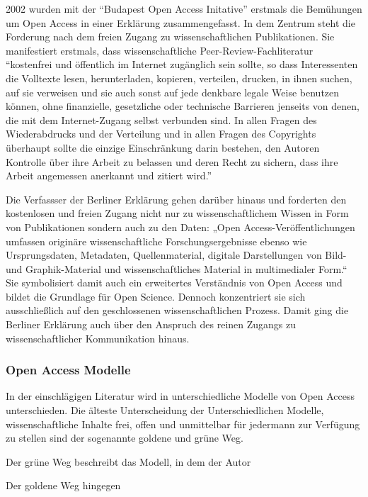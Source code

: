 2002 wurden mit der “Budapest Open Access Initative”\cite{cite:21} erstmals die Bemühungen um Open Access in einer Erklärung zusammengefasst. In dem Zentrum steht die Forderung nach dem freien Zugang zu wissenschaftlichen Publikationen. Sie manifestiert erstmals, dass wissenschaftliche Peer-Review-Fachliteratur “kostenfrei und öffentlich im Internet zugänglich sein sollte, so dass Interessenten die Volltexte lesen, herunterladen, kopieren, verteilen, drucken, in ihnen suchen, auf sie verweisen und sie auch sonst auf jede denkbare legale Weise benutzen können, ohne finanzielle, gesetzliche oder technische Barrieren jenseits von denen, die mit dem Internet-Zugang selbst verbunden sind. In allen Fragen des Wiederabdrucks und der Verteilung und in allen Fragen des Copyrights überhaupt sollte die einzige Einschränkung darin bestehen, den Autoren Kontrolle über ihre Arbeit zu belassen und deren Recht zu sichern, dass ihre Arbeit angemessen anerkannt und zitiert wird.” 

Die Verfassser der Berliner Erklärung gehen darüber hinaus und forderten den kostenlosen und freien Zugang nicht nur zu wissenschaftlichem Wissen in Form von Publikationen sondern auch zu den Daten: „Open Access-Veröffentlichungen umfassen originäre wissenschaftliche Forschungsergebnisse ebenso wie Ursprungsdaten, Metadaten, Quellenmaterial, digitale Darstellungen von Bild- und Graphik-Material und wissenschaftliches Material in multimedialer Form.“\cite{cite:22} Sie symbolisiert damit auch ein erweitertes Verständnis von Open Access und bildet die Grundlage für Open Science. Dennoch konzentriert sie sich ausschließlich auf den geschlossenen wissenschaftlichen Prozess. Damit ging die Berliner Erklärung auch über den Anspruch des reinen Zugangs zu wissenschaftlicher Kommunikation hinaus.

\subsubsection{Open Access Modelle}

In der einschlägigen Literatur wird in unterschiedliche Modelle von Open Access unterschieden\cite{cite:22}. Die älteste Unterscheidung der Unterschiedlichen Modelle, wissenschaftliche Inhalte frei, offen und unmittelbar für jedermann zur Verfügung zu stellen sind der sogenannte goldene und grüne Weg.\cite{cite:22} 

Der grüne Weg beschreibt das Modell, in dem der Autor

Der goldene Weg hingegen

